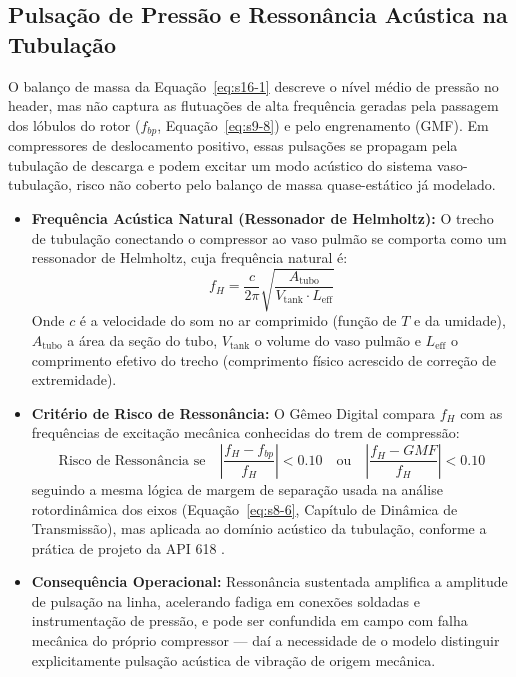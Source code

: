 \documentclass[12pt,a4paper]{article}
\numberwithin{equation}{section}
\numberwithin{table}{section}
\numberwithin{figure}{section}
\begin{document}
\subsection{Pulsação de Pressão e Ressonância Acústica na Tubulação}
O balanço de massa da Equação~\eqref{eq:s16-1} descreve o nível médio de pressão no header, mas não captura as flutuações de alta frequência geradas pela passagem dos lóbulos do rotor ($f_{bp}$, Equação~\eqref{eq:s9-8}) e pelo engrenamento (GMF). Em compressores de deslocamento positivo, essas pulsações se propagam pela tubulação de descarga e podem excitar um modo acústico do sistema vaso-tubulação, risco não coberto pelo balanço de massa quase-estático já modelado.
\begin{itemize}
	\item \textbf{Frequência Acústica Natural (Ressonador de Helmholtz):} O trecho de tubulação conectando o compressor ao vaso pulmão se comporta como um ressonador de Helmholtz, cuja frequência natural é:
	\begin{equation}\label{eq:s16-2}
 f_H = \frac{c}{2\pi} \sqrt{\frac{A_{\text{tubo}}}{V_{\text{tank}} \cdot L_{\text{eff}}}} 
\end{equation}
	Onde $c$ é a velocidade do som no ar comprimido (função de $T$ e da umidade), $A_{\text{tubo}}$ a área da seção do tubo, $V_{\text{tank}}$ o volume do vaso pulmão e $L_{\text{eff}}$ o comprimento efetivo do trecho (comprimento físico acrescido de correção de extremidade).
	\item \textbf{Critério de Risco de Ressonância:} O Gêmeo Digital compara $f_H$ com as frequências de excitação mecânica conhecidas do trem de compressão:
	\begin{equation}\label{eq:s16-3}
 \text{Risco de Ressonância se} \quad \left| \frac{f_H - f_{bp}}{f_H} \right| < 0.10 \quad \text{ou} \quad \left| \frac{f_H - GMF}{f_H} \right| < 0.10 
\end{equation}
	seguindo a mesma lógica de margem de separação usada na análise rotordinâmica dos eixos (Equação~\eqref{eq:s8-6}, Capítulo de Dinâmica de Transmissão), mas aplicada ao domínio acústico da tubulação, conforme a prática de projeto da API 618 \cite{api618}.
	\item \textbf{Consequência Operacional:} Ressonância sustentada amplifica a amplitude de pulsação na linha, acelerando fadiga em conexões soldadas e instrumentação de pressão, e pode ser confundida em campo com falha mecânica do próprio compressor — daí a necessidade de o modelo distinguir explicitamente pulsação acústica de vibração de origem mecânica.
\end{itemize}
\end{document}
